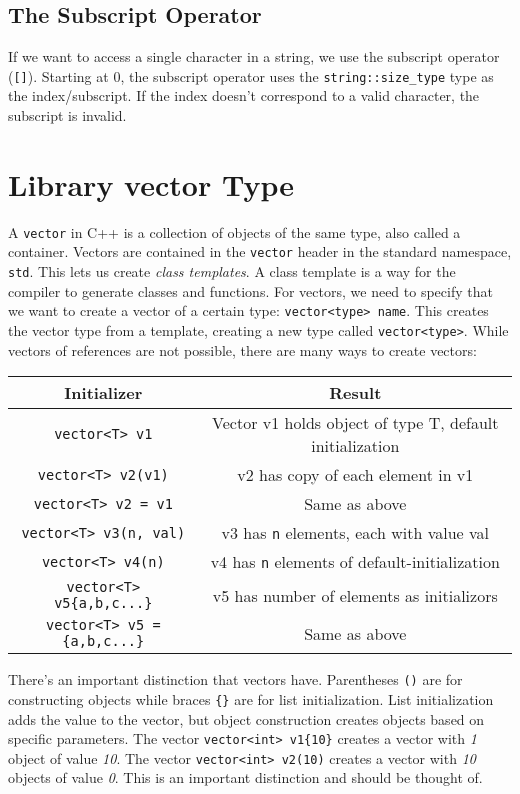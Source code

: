 \documentclass[12pt, a4paper]{report}
\begin{document}
\subsection{The Subscript Operator}
If we want to access a single character in a string, we use the subscript operator (\verb|[]|). Starting at 0, the subscript operator uses the
\verb|string::size_type| type as the index/subscript. If the index doesn't correspond to a valid character, the subscript is invalid.
\section{Library vector Type}
A \verb|vector| in C++ is a collection of objects of the same type, also called a container. Vectors are contained in the \verb|vector| header in the standard namespace, \verb|std|. This lets us create \emph{class templates}. A class template is a way for the compiler to generate classes and functions. For vectors, 
we need to specify that we want to create a vector of a certain type: \verb|vector<type> name|. This creates the vector type from a template, creating a new type called \verb|vector<type>|. While vectors of references are not possible, there are many ways to create vectors:
\begin{center}
  \begin{tabular}{ |c|c| }
    \hline
    \textbf{Initializer} & \textbf{Result} \\
    \hline
    \verb|vector<T> v1| & Vector v1 holds object of type T, default initialization \\
    \hline
    \verb|vector<T> v2(v1)| & v2 has copy of each element in v1 \\
    \hline
    \verb|vector<T> v2 = v1| & Same as above \\
    \hline
    \verb|vector<T> v3(n, val)| & v3 has \verb|n| elements, each with value val \\
    \hline
    \verb|vector<T> v4(n)| & v4 has \verb|n| elements of default-initialization \\
    \hline
    \verb|vector<T> v5{a,b,c...}| & v5 has number of elements as initializors \\
    \hline
    \verb|vector<T> v5 = {a,b,c...}| & Same as above \\
    \hline
  \end{tabular}
\end{center}
There's an important distinction that vectors have. Parentheses \verb|()| are for constructing objects while braces \verb|{}| are for list initialization.
List initialization adds the value to the vector, but object construction creates objects based on specific parameters. 
The vector \verb|vector<int> v1{10}| creates a vector with \emph{1} object of value \emph{10}.
The vector \verb|vector<int> v2(10)| creates a vector with \emph{10} objects of value \emph{0}. This is an important distinction and should be thought of.	
\end{document}
